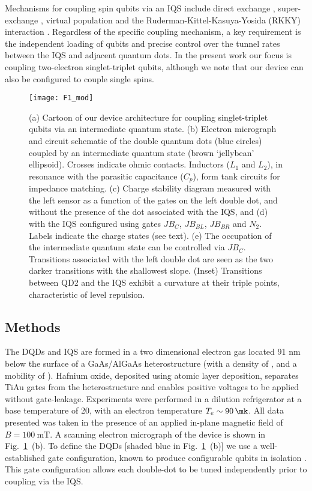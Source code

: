 Mechanisms for coupling spin qubits via an IQS include direct exchange \cite{srinivasa,rkkycharlie}, super-exchange \cite{superexchange, taruchaexchange}, virtual population \cite{virtualexchange,bluhm} and the Ruderman-Kittel-Kasuya-Yosida (RKKY) interaction \cite{rkkycharlie}. Regardless of the specific coupling mechanism, a key requirement is the independent loading of qubits and precise control over the tunnel rates between the IQS and adjacent quantum dots. In the present work our focus is coupling two-electron singlet-triplet qubits, although we note that our device can also be configured to couple single spins.

\begin{figure}
\texttt{[image: F1\_mod]}
\caption{\label{fig:5dot_fig1}(a) Cartoon of our device architecture for coupling singlet-triplet qubits via an intermediate quantum state. (b) Electron micrograph and circuit schematic of the double quantum dots (blue circles) coupled by an intermediate quantum state (brown `jellybean' ellipsoid). Crosses indicate ohmic contacts. Inductors ($L_1$ and $L_2$), in resonance with the parasitic capacitance ($C_p$), form tank circuits for impedance matching. (c) Charge stability diagram measured with the left sensor as a function of the gates on the left double dot, and without the presence of the dot associated with the IQS, and (d) with the IQS configured using gates  $JB_C$, $JB_{BL}$, $JB_{BR}$ and $N_2$. Labels  indicate the charge states (see text). (e) The occupation of the intermediate quantum state can be controlled via $JB_{C}$. Transitions associated with the left double dot are seen as the two darker transitions with the shallowest slope. (Inset) Transitions between QD2 and the IQS exhibit a curvature at their triple points, characteristic of level repulsion.}

\end{figure}

\subsection{Methods}
The DQDs and IQS are formed in a two dimensional electron gas located 91 nm below the surface of a GaAs/AlGaAs heterostructure (with a density of , and a mobility of ). Hafnium oxide, deposited using atomic layer deposition, separates TiAu gates from the heterostructure and enables positive voltages to be applied without gate-leakage. Experiments were performed in a dilution refrigerator at a base temperature of \SI{20}{\mk}, with an electron temperature $T_{e} \sim \SI{90}{\mk}$. All data presented was taken in the presence of an applied in-plane magnetic field of $B = \SI{100}{\milli\tesla}$. A scanning electron micrograph of the device is shown in Fig.~\ref{fig:5dot_fig1}~(b). To define the DQDs [shaded blue in Fig.~\ref{fig:5dot_fig1}~(b)] we use a well-established gate configuration, known to produce configurable qubits in isolation \cite{hornibrook,croot}. This gate configuration allows each double-dot to be tuned independently prior to coupling via the IQS. 

